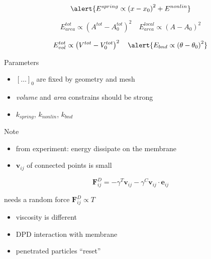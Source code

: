 \bframe{}
\bcc  
  \bc
  \ec
  \bc
  \ec
\ecc  
\eframe

\[
  \alert{E^{spring} \propto \left( x - x_0 \right)^2 + E^{nonlin}}
\]

\[
  E^{tot}_{area} \propto \left( A^{tot} - A_{0}^{tot} \right)^2 \quad
  E^{local}_{area} \propto \left( A - A_{0} \right)^2
\]

\[
         E^{tot}_{vol} \propto \left( V^{tot} - V_{0}^{tot} \right)^2 \quad
  \alert{E_{bnd} \propto \left(\theta - \theta_0 \right)^2}
\]

\begin{exampleblock}{Parameters}
  \begin{itemize}
  \item $[\ldots]_0$ are fixed by geometry and mesh
  \item \textit{volume} and \textit{area} constrains should be strong
  \item $k_{spring}$, $k_{nonlin}$, $k_{bnd}$
  \end{itemize}
\end{exampleblock}
\eframe

\begin{exampleblock}{Note}
  \begin{itemize}
    \item from experiment: energy dissipate on the membrane
    \item $\mathbf{v}_{ij}$ of connected points is small
  \end{itemize}
\end{exampleblock}
  
\[
\mathbf{F}_{ij}^D = - \gamma^T \mathbf{v}_{ij} - \gamma^C \mathbf{v}_{ij} \cdot \mathbf{e}_{ij}
\]

needs a random force $\mathbf{F}_{ij}^D \propto T$
\eframe

\begin{itemize}
  \item viscosity is different
  \item DPD interaction with membrane
  \item penetrated particles ``reset''
\end{itemize}
\eframe
